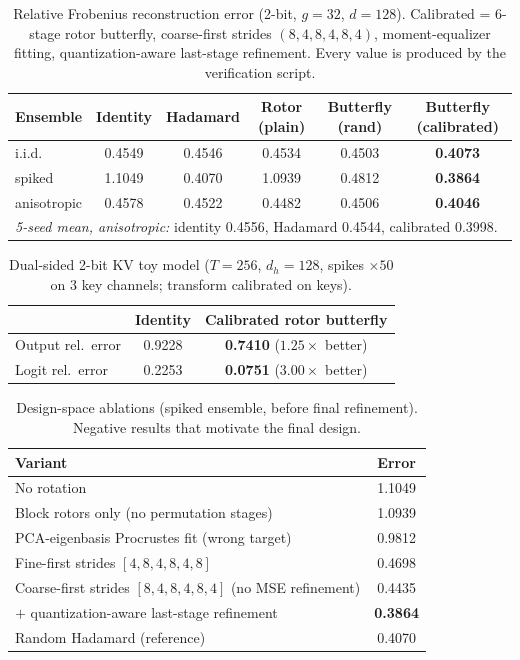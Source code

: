 \documentclass{article}
\begin{document}
\begin{table}[t]
\centering\small
\caption{Relative Frobenius reconstruction error (2-bit, $g=32$, $d=128$).
Calibrated = 6-stage rotor butterfly, coarse-first strides
$(8,4,8,4,8,4)$, moment-equalizer fitting, quantization-aware last-stage
refinement. Every value is produced by the verification script.}
\label{tab:main}
\begin{tabular}{lccccc}
\toprule
Ensemble & Identity & Hadamard & Rotor (plain) & Butterfly (rand) & Butterfly (calibrated) \\
\midrule
i.i.d.       & 0.4549 & 0.4546 & 0.4534 & 0.4503 & \textbf{0.4073} \\
spiked       & 1.1049 & 0.4070 & 1.0939 & 0.4812 & \textbf{0.3864} \\
anisotropic  & 0.4578 & 0.4522 & 0.4482 & 0.4506 & \textbf{0.4046} \\
\midrule
\multicolumn{6}{l}{\emph{5-seed mean, anisotropic:} identity 0.4556, Hadamard 0.4544, calibrated 0.3998.}\\
\bottomrule
\end{tabular}
\end{table}

\begin{table}[t]
\centering\small
\caption{Dual-sided 2-bit KV toy model ($T=256$, $d_h=128$, spikes
$\times50$ on 3 key channels; transform calibrated on keys).}
\label{tab:kv}
\begin{tabular}{lcc}
\toprule
 & Identity & Calibrated rotor butterfly \\
\midrule
Output rel.\ error & 0.9228 & \textbf{0.7410} ($1.25\times$ better) \\
Logit rel.\ error  & 0.2253 & \textbf{0.0751} ($3.00\times$ better) \\
\bottomrule
\end{tabular}
\end{table}

\begin{table}[t]
\centering\small
\caption{Design-space ablations (spiked ensemble, before final refinement).
Negative results that motivate the final design.}
\label{tab:ablation}
\begin{tabular}{lc}
\toprule
Variant & Error \\
\midrule
No rotation & 1.1049 \\
Block rotors only (no permutation stages) & 1.0939 \\
PCA-eigenbasis Procrustes fit (wrong target) & 0.9812 \\
Fine-first strides $[4,8,4,8,4,8]$ & 0.4698 \\
Coarse-first strides $[8,4,8,4,8,4]$ (no MSE refinement) & 0.4435 \\
$+$ quantization-aware last-stage refinement & \textbf{0.3864} \\
Random Hadamard (reference) & 0.4070 \\
\bottomrule
\end{tabular}
\end{table}
\end{document}
